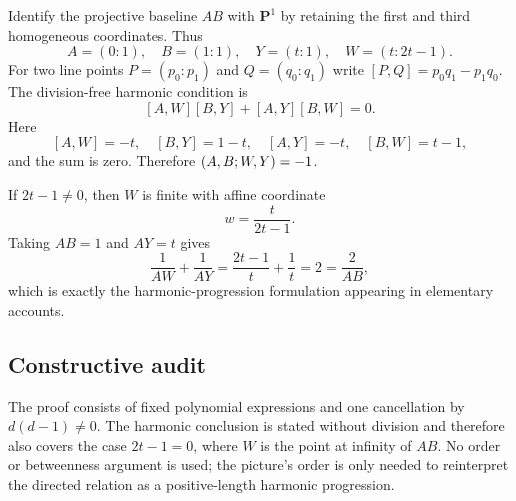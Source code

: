 Identify the projective baseline $AB$ with $\mathbf P^1$ by retaining the first and third homogeneous coordinates.  Thus
\[
A=(0:1),\quad B=(1:1),\quad Y=(t:1),\quad W=(t:2t-1).
\]
For two line points $P=(p_0:p_1)$ and $Q=(q_0:q_1)$ write
$[P,Q]=p_0q_1-p_1q_0$.  The division-free harmonic condition is
\[
[A,W][B,Y]+[A,Y][B,W]=0.
\]
Here
\[
[A,W]=-t,\quad [B,Y]=1-t,\quad [A,Y]=-t,\quad [B,W]=t-1,
\]
and the sum is zero.  Therefore $(A,B;W,Y)=-1$.

If $2t-1\ne0$, then $W$ is finite with affine coordinate
\[
w=\frac{t}{2t-1}.
\]
Taking $AB=1$ and $AY=t$ gives
\[
\frac1{AW}+\frac1{AY}=\frac{2t-1}{t}+\frac1t=2=\frac2{AB},
\]
which is exactly the harmonic-progression formulation appearing in elementary accounts.

\subsection{Constructive audit}

The proof consists of fixed polynomial expressions and one cancellation by $d(d-1)\ne0$.  The harmonic conclusion is stated without division and therefore also covers the case $2t-1=0$, where $W$ is the point at infinity of $AB$.  No order or betweenness argument is used; the picture's order is only needed to reinterpret the directed relation as a positive-length harmonic progression.
